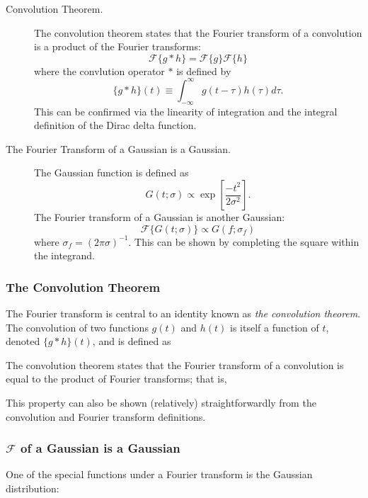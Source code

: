 \documentclass[preprint]{aastex}
\begin{document}
\begin{description}

\item[Convolution Theorem.]
    The convolution theorem states that the
    Fourier transform of a convolution is a product of the Fourier transforms:
    \begin{equation}
      \mathcal{F}\{g \ast h\} = \mathcal{F}\{g\}\mathcal{F}\{h\}
    \end{equation}
    where the convlution operator $\ast$ is defined by
    \begin{equation}
      \{g \ast h\}(t) \equiv \int_{-\infty}^\infty g(t - \tau) h(\tau) d\tau.
    \end{equation}
    This can be confirmed via the linearity of integration and the integral
    definition of the Dirac delta function.

\item[The Fourier Transform of a Gaussian is a Gaussian.]
    The Gaussian function is defined as
    \begin{equation}
    G(t;\sigma) \propto \exp\left[\frac{-t^2}{2\sigma^2}\right].
    \end{equation}
    The Fourier transform of a Gaussian is another Gaussian:
    \begin{equation}
    \mathcal{F}\{G(t;\sigma)\} \propto G(f; \sigma_f)
    \end{equation}
    where $\sigma_f = (2\pi\sigma)^{-1}$. This can be shown by completing the
    square within the integrand.
\end{description}

\subsubsection{The Convolution Theorem}

The Fourier transform is central to an identity known as {\it the convolution theorem}.
The convolution of two functions $g(t)$ and $h(t)$ is itself a function of $t$, denoted $\{g \ast h\}(t)$, and is defined as


The convolution theorem states that the Fourier transform of a convolution is equal to the product of Fourier transforms; that is,


This property can also be shown (relatively) straightforwardly from the convolution and Fourier transform definitions.

\subsubsection{$\mathcal{F}$ of a Gaussian is a Gaussian}
One of the special functions under a Fourier transform is the Gaussian distribution:
\end{document}

